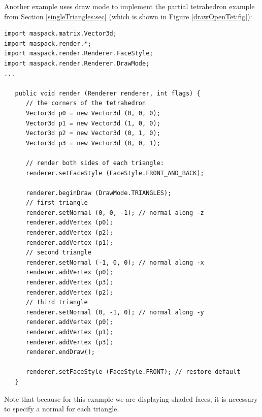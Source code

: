 Another example uses draw mode to implement the partial tetrahedron
example from Section \ref{singleTriangles:sec} (which is shown in Figure
\ref{drawOpenTet:fig}):
%
\begin{lstlisting}[]
import maspack.matrix.Vector3d;
import maspack.render.*;
import maspack.render.Renderer.FaceStyle;
import maspack.render.Renderer.DrawMode;
...

   public void render (Renderer renderer, int flags) {
      // the corners of the tetrahedron
      Vector3d p0 = new Vector3d (0, 0, 0);
      Vector3d p1 = new Vector3d (1, 0, 0);
      Vector3d p2 = new Vector3d (0, 1, 0);
      Vector3d p3 = new Vector3d (0, 0, 1);
      
      // render both sides of each triangle:
      renderer.setFaceStyle (FaceStyle.FRONT_AND_BACK); 
   
      renderer.beginDraw (DrawMode.TRIANGLES);
      // first triangle
      renderer.setNormal (0, 0, -1); // normal along -z
      renderer.addVertex (p0); 
      renderer.addVertex (p2);
      renderer.addVertex (p1);
      // second triangle
      renderer.setNormal (-1, 0, 0); // normal along -x
      renderer.addVertex (p0); 
      renderer.addVertex (p3);
      renderer.addVertex (p2);
      // third triangle
      renderer.setNormal (0, -1, 0); // normal along -y
      renderer.addVertex (p0);
      renderer.addVertex (p1);
      renderer.addVertex (p3);
      renderer.endDraw();
   
      renderer.setFaceStyle (FaceStyle.FRONT); // restore default
   }
\end{lstlisting}
%
Note that because for this example we are displaying shaded faces, it
is necessary to specify a normal for each triangle.

